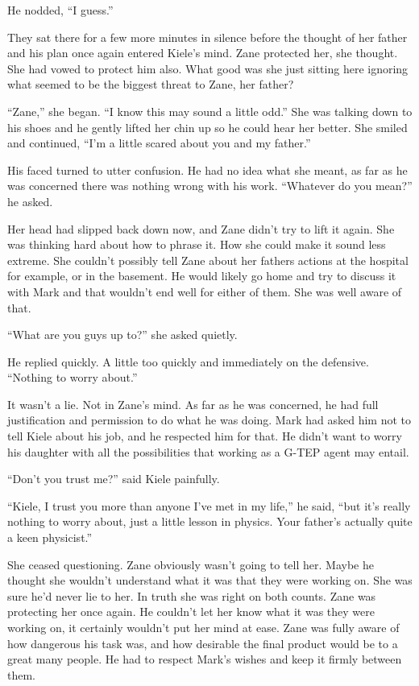 He nodded, ``I guess.''

They sat there for a few more minutes in silence before the thought of her father and his plan once again entered Kiele's mind.  Zane protected her, she thought.  She had vowed to protect him also.  What good was she just sitting here ignoring what seemed to be the biggest threat to Zane, her father?

``Zane,'' she began.  ``I know this may sound a little odd.''  She was talking down to his shoes and he gently lifted her chin up so he could hear her better.  She smiled and continued, ``I'm a little scared about you and my father.''

His faced turned to utter confusion.  He had no idea what she meant, as far as he was concerned there was nothing wrong with his work.  ``Whatever do you mean?'' he asked.

Her head had slipped back down now, and Zane didn't try to lift it again.  She was thinking hard about how to phrase it.  How she could make it sound less extreme.  She couldn't possibly tell Zane about her fathers actions at the hospital for example, or in the basement.  He would likely go home and try to discuss it with Mark and that wouldn't end well for either of them.  She was well aware of that.  

``What are you guys up to?'' she asked quietly.

He replied quickly.  A little too quickly and immediately on the defensive.  ``Nothing to worry about.''

It wasn't a lie.  Not in Zane's mind.  As far as he was concerned, he had full justification and permission to do what he was doing.  Mark had asked him not to tell Kiele about his job, and he respected him for that.  He didn't want to worry his daughter with all the possibilities that working as a G-TEP agent may entail.

``Don't you trust me?'' said Kiele painfully.

``Kiele, I trust you more than anyone I've met in my life,'' he said, ``but it's really nothing to worry about, just a little lesson in physics.  Your father's actually quite a keen physicist.''

She ceased questioning.  Zane obviously wasn't going to tell her.  Maybe he thought she wouldn't understand what it was that they were working on.  She was sure he'd never lie to her.  In truth she was right on both counts.  Zane was protecting her once again.  He couldn't let her know what it was they were working on, it certainly wouldn't put her mind at ease.  Zane was fully aware of how dangerous his task was, and how desirable the final product would be to a great many people.  He had to respect Mark's wishes and keep it firmly between them.

